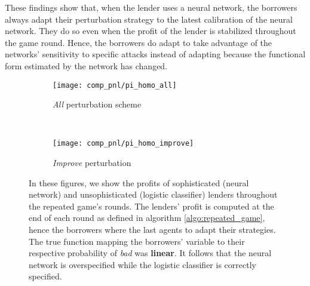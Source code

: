 \documentclass[12pt]{article} %
\begin{document}
These findings show that, when the lender uses a neural network, the borrowers always adapt their perturbation strategy to the latest calibration of the neural network. They do so even when the profit of the lender is stabilized throughout the game round. Hence, the borrowers do adapt to take advantage of the networks' sensitivity to specific attacks instead of adapting because the functional form estimated by the network has changed. 







\begin{figure*}[ht!]
    \centering
    \begin{subfigure}{0.5\textwidth}
        \centering
        \texttt{[image: comp\_pnl/pi\_homo\_all]}
        \caption{\textit{All} perturbation scheme}
        \label{fig:cross_algo_all}
    \end{subfigure}%
    ~ 
    \begin{subfigure}{0.5\textwidth}
        \centering
        \texttt{[image: comp\_pnl/pi\_homo\_improve]}
            \caption{\textit{Improve} perturbation}
        \label{fig:cross_algo_improve}
    \end{subfigure}
    \caption{
In these figures, we show the profits of sophisticated (neural network) and unsophisticated (logistic classifier) lenders throughout the repeated game's rounds. The lenders' profit is computed at the end of each round as defined in algorithm \ref{algo:repeated_game}, hence the borrowers where the last agents to adapt their strategies. The true function mapping the borrowers' variable to their respective probability of \textit{bad} was \textbf{linear}. It follows that the neural network is overspecified while the logistic classifier is correctly specified.}
\end{figure*}
\end{document}
